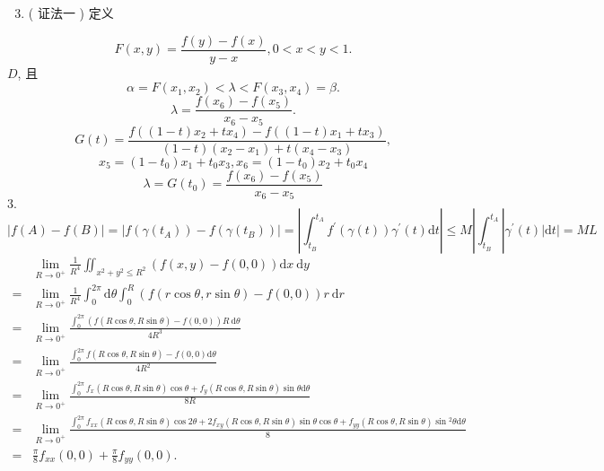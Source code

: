 \documentclass[10pt]{article}
\begin{document}
\begin{enumerate}
  \setcounter{enumi}{2}
  \item ( 证法一 )  定义 
\end{enumerate}
$$
F(x, y)=\frac{f(y)-f(x)}{y-x}, 0<x<y<1 .
$$
$D$,  且 
$$
\alpha=F\left(x_{1}, x_{2}\right)<\lambda<F\left(x_{3}, x_{4}\right)=\beta .
$$
$$
\lambda=\frac{f\left(x_{6}\right)-f\left(x_{5}\right)}{x_{6}-x_{5}} .
$$
$$
G(t)=\frac{f\left((1-t) x_{2}+t x_{4}\right)-f\left((1-t) x_{1}+t x_{3}\right)}{(1-t)\left(x_{2}-x_{1}\right)+t\left(x_{4}-x_{3}\right)},
$$
$$
x_{5}=\left(1-t_{0}\right) x_{1}+t_{0} x_{3}, x_{6}=\left(1-t_{0}\right) x_{2}+t_{0} x_{4}
$$
$$
\lambda=G\left(t_{0}\right)=\frac{f\left(x_{6}\right)-f\left(x_{5}\right)}{x_{6}-x_{5}}
$$
$3 .$
$$
|f(A)-f(B)|=\left|f\left(\gamma\left(t_{A}\right)\right)-f\left(\gamma\left(t_{B}\right)\right)\right|=\left|\int_{t_{B}}^{t_{A}} f^{\prime}(\gamma(t)) \gamma^{\prime}(t) \mathrm{d} t\right| \leqslant M\left|\int_{t_{B}}^{t_{A}}\right| \gamma^{\prime}(t)|\mathrm{d} t|=M L
$$
$$
\begin{aligned}
& \lim _{R \rightarrow 0^{+}} \frac{1}{R^{4}} \iint_{x^{2}+y^{2} \leqslant R^{2}}(f(x, y)-f(0,0)) \mathrm{d} x \mathrm{~d} y \\
=& \lim _{R \rightarrow 0^{+}} \frac{1}{R^{4}} \int_{0}^{2 \pi} \mathrm{d} \theta \int_{0}^{R}(f(r \cos \theta, r \sin \theta)-f(0,0)) r \mathrm{~d} r \\
=& \lim _{R \rightarrow 0^{+}} \frac{\int_{0}^{2 \pi}(f(R \cos \theta, R \sin \theta)-f(0,0)) R \mathrm{~d} \theta}{4 R^{3}} \\
=& \lim _{R \rightarrow 0^{+}} \frac{\int_{0}^{2 \pi} f(R \cos \theta, R \sin \theta)-f(0,0) \mathrm{d} \theta}{4 R^{2}} \\
=& \lim _{R \rightarrow 0^{+}} \frac{\int_{0}^{2 \pi} f_{x}(R \cos \theta, R \sin \theta) \cos \theta+f_{y}(R \cos \theta, R \sin \theta) \sin \theta \mathrm{d} \theta}{8 R} \\
=& \lim _{R \rightarrow 0^{+}} \frac{\int_{0}^{2 \pi} f_{x x}(R \cos \theta, R \sin \theta) \cos 2 \theta+2 f_{x y}(R \cos \theta, R \sin \theta) \sin \theta \cos \theta+f_{y y}(R \cos \theta, R \sin \theta) \sin { }^{2} \theta \mathrm{d} \theta}{8} \\
=& \frac{\pi}{8} f_{x x}(0,0)+\frac{\pi}{8} f_{y y}(0,0) .
\end{aligned}
$$
\end{document}
